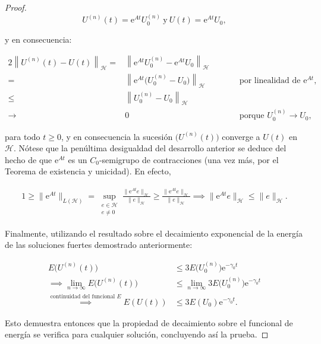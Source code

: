 \begin{proof}
    \[U^{(n)}(t) = \mathrm{e}^{At}U_0^{(n)} \ \text{y} \ U(t) = \mathrm{e}^{At}U_0,\]

    y en consecuencia:

    \begin{alignat*}{2}
        \left\| U^{(n)}(t) - U(t) \right\|_{\mathcal H}
        =& \left\| \mathrm{e}^{At}U_0^{(n)} - \mathrm{e}^{At}U_0 \right\|_{\mathcal H} \\[2mm]
        =& \left\| \mathrm{e}^{At}\bigl(U_0^{(n)} - U_0\bigr) \right\|_{\mathcal H}
        &\qquad& \text{por linealidad de } \mathrm{e}^{At}, \\[2mm]
        \leq& \left\| U_0^{(n)} - U_0 \right\|_{\mathcal H} \\
        \longrightarrow & 0
        && \text{porque } U^{(n)}_0 \rightarrow U_0,
    \end{alignat*}

    para todo $t \geq 0$, y en consecuencia la sucesión $\Big(U^{(n)}(t)\Big)$ converge a $U(t)$ en $\mathcal{H}$. Nótese que la penúltima desigualdad del desarrollo anterior se deduce del hecho de que $\mathrm{e}^{At}$ es un $C_0$-semigrupo de contracciones (una vez más, por el Teorema de existencia y unicidad). En efecto,

    \begin{align*}
        1 \geq \lVert \mathrm{e}^{At} \rVert_{L(\mathcal{H})} = \sup_{\substack{e \in \mathcal{H} \\ e \neq 0}} \frac{\lVert \mathrm{e}^{At}e \rVert_{\mathcal{H}}}{\lVert e \rVert_{\mathcal{H}}} \geq \frac{\lVert \mathrm{e}^{At}e \rVert_{\mathcal{H}}}{\lVert e \rVert_{\mathcal{H}}} \implies \lVert \mathrm{e}^{At}e\rVert_{\mathcal{H}} \leq \lVert e\rVert_{\mathcal{H}}.
    \end{align*}

    Finalmente, utilizando el resultado sobre el decaimiento exponencial de la energía de las soluciones fuertes demostrado anteriormente:

    \begin{align*}
        E\Big(U^{(n)}(t)\Big) &\leq 3E\Big(U^{(n)}_0\Big)\mathrm{e}^{-\gamma_0 t}\\
        \implies \lim_{n\rightarrow \infty}E\Big(U^{(n)}(t)\Big) &\leq \lim_{n\rightarrow \infty}3E\Big(U^{(n)}_0\Big)\mathrm{e}^{-\gamma_0 t}\\
        \overset{\text{continuidad del funcional }E}{\implies} E(U(t)) &\leq 3E(U_0)\mathrm{e}^{-\gamma_0 t}.
    \end{align*}

    Esto demuestra entonces que la propiedad de decaimiento sobre el funcional de energía se verifica para cualquier solución, concluyendo así la prueba.
\end{proof}

